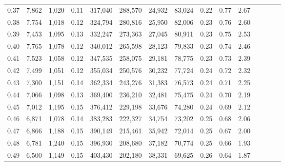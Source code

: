 \begin{tabular}{rrrcrrrrrrrrrrr}
0.37 &   7,862 &   1,020 &                                       0.11 &  317,040 &  288,570 &   24,932 &   83,024 &  0.22 &  0.77 &                         2.67 \\
0.38 &   7,754 &   1,018 &                                       0.12 &  324,794 &  280,816 &   25,950 &   82,006 &  0.23 &  0.76 &                         2.60 \\
0.39 &   7,453 &   1,095 &                                       0.13 &  332,247 &  273,363 &   27,045 &   80,911 &  0.23 &  0.75 &                         2.53 \\
0.40 &   7,765 &   1,078 &                                       0.12 &  340,012 &  265,598 &   28,123 &   79,833 &  0.23 &  0.74 &                         2.46 \\
0.41 &   7,523 &   1,058 &                                       0.12 &  347,535 &  258,075 &   29,181 &   78,775 &  0.23 &  0.73 &                         2.39 \\
0.42 &   7,499 &   1,051 &                                       0.12 &  355,034 &  250,576 &   30,232 &   77,724 &  0.24 &  0.72 &                         2.32 \\
0.43 &   7,300 &   1,151 &                                       0.14 &  362,334 &  243,276 &   31,383 &   76,573 &  0.24 &  0.71 &                         2.25 \\
0.44 &   7,066 &   1,098 &                                       0.13 &  369,400 &  236,210 &   32,481 &   75,475 &  0.24 &  0.70 &                         2.19 \\
0.45 &   7,012 &   1,195 &                                       0.15 &  376,412 &  229,198 &   33,676 &   74,280 &  0.24 &  0.69 &                         2.12 \\
0.46 &   6,871 &   1,078 &                                       0.14 &  383,283 &  222,327 &   34,754 &   73,202 &  0.25 &  0.68 &                         2.06 \\
0.47 &   6,866 &   1,188 &                                       0.15 &  390,149 &  215,461 &   35,942 &   72,014 &  0.25 &  0.67 &                         2.00 \\
0.48 &   6,781 &   1,240 &                                       0.15 &  396,930 &  208,680 &   37,182 &   70,774 &  0.25 &  0.66 &                         1.93 \\
0.49 &   6,500 &   1,149 &                                       0.15 &  403,430 &  202,180 &   38,331 &   69,625 &  0.26 &  0.64 &                         1.87 \\

\end{tabular}
